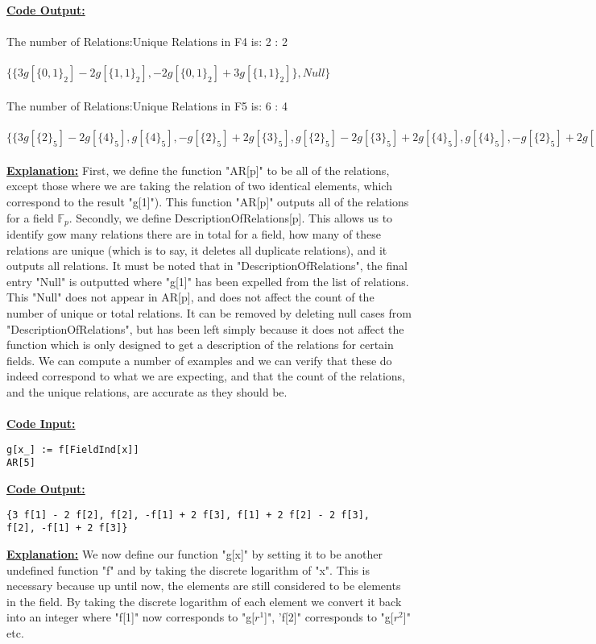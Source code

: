 \documentclass[11pt]{article}
\theoremstyle{plain}
\theoremstyle{definition}
\begin{document}
\textbf{\underline{Code Output:}}\\
\\
The number of Relations:Unique Relations in F4 is: 2 : 2\\
\\
$\{\{3 g[\{0, 1\}_2] - 
2 g[\{1, 1\}_2], -2 g[\{0, 1\}_2]+ 
3 g[\{1, 1\}_2]\}, Null\}$\\
\\
The number of Relations:Unique Relations in F5 is: 6 : 4\\
\\
$\{\{3 g[\{2\}_5] - 2 g[\{4\}_5], 
g[\{4\}_5], -g[\{2\}_5] + 
2 g[\{3\}_5], 
g[\{2\}_5] - 2 g[\{3\}_5] + 
2 g[\{4\}_5], 
g[\{4\}_5], -g[\{2\}_5] + 
2 g[\{3\}_5]\}, Null\}$\\
\\
\textbf{\underline{Explanation:}} First, we  define the function "AR[p]" to be all of the relations, except those where we are taking the relation of two identical elements, which correspond to the result "g[1]"). This function "AR[p]" outputs all of the relations for a field $\mathbb{F}_p$. Secondly, we define DescriptionOfRelations[p]. This allows us to identify gow many relations there are in total for a field, how many of these relations are unique (which is to say, it deletes all duplicate relations), and it outputs all relations. It must be noted that in "DescriptionOfRelations", the final entry "Null" is outputted where "g[1]" has been expelled from the list of relations. This "Null" does not appear in AR[p], and does not affect the count of the number of unique or total relations. It can be removed by deleting null cases from "DescriptionOfRelations", but has been left simply because it does not affect the function which is only designed to get a description of the relations for certain fields. We can compute a number of examples and we can verify that these do indeed correspond to what we are expecting, and that the count of the relations, and the unique relations, are accurate as they should be.\\
\\
\textbf{\underline{Code Input:}}
\begin{verbatim}
g[x_] := f[FieldInd[x]]
AR[5]
\end{verbatim}
\textbf{\underline{Code Output:}}
\begin{verbatim}
{3 f[1] - 2 f[2], f[2], -f[1] + 2 f[3], f[1] + 2 f[2] - 2 f[3], 
f[2], -f[1] + 2 f[3]}
\end{verbatim}
\textbf{\underline{Explanation:}} We now define our function "g[x]" by setting it to be another undefined function "f" and by taking the discrete logarithm of "x". This is necessary because up until now, the elements are still considered to be elements in the field. By taking the discrete logarithm of each element we convert it back into an integer where "f[1]" now corresponds to "g$[r^1$]", 'f[2]" corresponds to "g[$r^2$]" etc. \\
\end{document}

